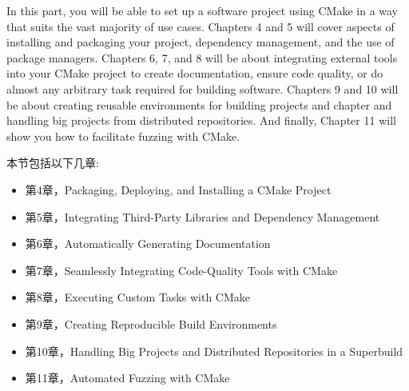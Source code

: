 In this part, you will be able to set up a software project using CMake in a way that suits the vast majority of use cases. Chapters 4 and 5 will cover aspects of installing and packaging your project, dependency management, and the use of package managers. Chapters 6, 7, and 8 will be about integrating external tools into your CMake project to create documentation, ensure code quality, or do almost any arbitrary task required for building software. Chapters 9 and 10 will be about creating reusable environments for building projects and chapter and handling big projects from distributed repositories. And finally, Chapter 11 will show you how to facilitate fuzzing with CMake.

本节包括以下几章:

\begin{itemize}
\item 第4章，Packaging, Deploying, and Installing a CMake Project
\item 第5章，Integrating Third-Party Libraries and Dependency Management
\item 第6章，Automatically Generating Documentation
\item 第7章，Seamlessly Integrating Code-Quality Tools with CMake
\item 第8章，Executing Custom Tasks with CMake
\item 第9章，Creating Reproducible Build Environments
\item 第10章，Handling Big Projects and Distributed Repositories in a Superbuild
\item 第11章，Automated Fuzzing with CMake
\end{itemize}